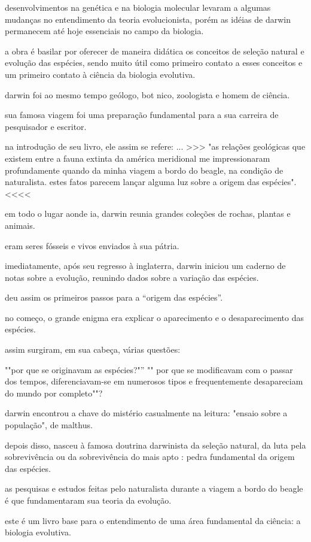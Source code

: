desenvolvimentos na genética e na biologia molecular levaram a algumas mudanças no entendimento da teoria evolucionista, porém as idéias de darwin permanecem até hoje essenciais no campo da biologia.

a obra é basilar por oferecer de maneira didática os conceitos de seleção natural e evolução das espécies, sendo muito útil como primeiro contato a esses conceitos e um primeiro contato à ciência da biologia evolutiva.

darwin foi ao mesmo tempo geólogo, bot nico, zoologista e homem de ciência. 

sua famosa viagem foi uma preparação fundamental para a sua carreira de pesquisador e escritor. 

na introdução de seu livro, ele assim se refere: 
... >>>   "as relações geológicas que existem entre a fauna extinta da américa meridional me impressionaram profundamente quando da minha viagem a bordo do beagle, na condição de naturalista. 
estes fatos parecem lançar alguma luz sobre a origem das espécies". <<<<

em todo o lugar aonde ia, darwin reunia grandes coleções de rochas, plantas e animais.

eram seres fósseis e vivos enviados à sua pátria. 

imediatamente, após seu regresso à inglaterra, darwin iniciou um caderno de notas sobre a evolução, reunindo dados sobre a variação das espécies. 

deu assim os primeiros passos para a “origem das espécies”. 

no começo, o grande enigma era explicar o aparecimento e o desaparecimento das espécies.

assim surgiram, em sua cabeça, várias questões:  

""por que se originavam as espécies?"”
"" por que se modificavam com o passar dos tempos, diferenciavam-se em numerosos tipos e frequentemente desapareciam do mundo por completo""?

darwin encontrou a chave do mistério  casualmente na leitura: 
"ensaio sobre a população", de malthus.

depois disso, nasceu à famosa doutrina darwinista da seleção natural, da luta pela sobrevivência ou da sobrevivência do mais apto : pedra fundamental da origem das espécies.

as pesquisas e estudos feitas pelo naturalista durante a viagem a bordo do beagle é que fundamentaram sua teoria da evolução.

este é um livro base para o entendimento de uma área fundamental da ciência: a biologia evolutiva.

